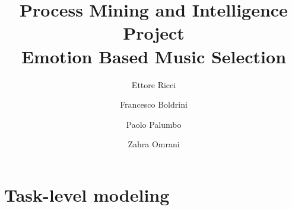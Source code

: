 \documentclass{article}
\title{Process Mining and Intelligence Project\\
\large{Emotion Based Music Selection}}
\author{Ettore Ricci \and
Francesco Boldrini \and
Paolo Palumbo \and
Zahra Omrani}
\begin{document}
\maketitle

\section{Task-level modeling}

\end{document}
